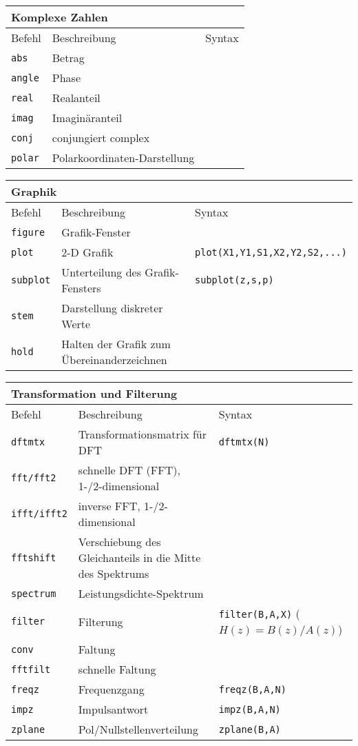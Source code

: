 \begin{tabular}{lp{5cm}p{2.2cm}}
\multicolumn{3}{l}{\textbf{Komplexe Zahlen}} \\\toprule
Befehl & Beschreibung & Syntax \\ \midrule
\verb|abs| & Betrag & \\ 
\verb|angle| & Phase & \\ 
\verb|real| & Realanteil &  \\ 
\verb|imag| & Imaginäranteil &  \\ 
\verb|conj| & conjungiert complex & \\ 
\verb|polar| & Polarkoordinaten-Darstellung & \\ \bottomrule
\end{tabular} 

\begin{tabular}{lp{5cm}p{2.2cm}}
\multicolumn{3}{l}{\textbf{Graphik}} \\\toprule
Befehl & Beschreibung & Syntax \\ \midrule
\verb|figure| & Grafik-Fenster & \\ 
\verb|plot| & 2-D Grafik & \verb|plot(X1,Y1,S1,X2,Y2,S2,...)|\\ 
\verb|subplot| & Unterteilung des Grafik-Fensters & \verb|subplot(z,s,p)| \\ 
\verb|stem| & Darstellung diskreter Werte &  \\ 
\verb|hold| & Halten der Grafik zum Übereinanderzeichnen & \\ \bottomrule
\end{tabular} 

\begin{tabular}{lp{5cm}p{2.2cm}}
\multicolumn{3}{l}{\textbf{Transformation und Filterung}} \\\toprule
Befehl & Beschreibung & Syntax \\ \midrule
\verb|dftmtx| & Transformationsmatrix für DFT & \verb|dftmtx(N)| \\ 
\verb|fft/fft2| & schnelle DFT (FFT), 1-/2-dimensional & \\ 
\verb|ifft/ifft2| & inverse FFT, 1-/2-dimensional & \\ 
\verb|fftshift| & Verschiebung des Gleichanteils in die Mitte des Spektrums &  \\ 
\verb|spectrum| & Leistungsdichte-Spektrum & \\ 
\verb|filter| & Filterung & \verb|filter(B,A,X)| ($H(z) = B(z)/A(z)$) \\
\verb|conv| & Faltung & \\
\verb|fftfilt| & schnelle Faltung & \\
\verb|freqz| & Frequenzgang & \verb|freqz(B,A,N)| \\ 
\verb|impz| & Impulsantwort & \verb|impz(B,A,N)| \\ 
\verb|zplane| & Pol/Nullstellenverteilung & \verb|zplane(B,A)| \\\bottomrule
\end{tabular} 

